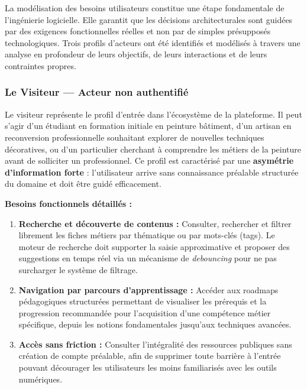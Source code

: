 \documentclass[12pt,a4paper]{report}
\begin{document}
\noindent
La modélisation des besoins utilisateurs constitue une étape fondamentale de l'ingénierie logicielle. Elle garantit que les décisions architecturales sont guidées par des exigences fonctionnelles réelles et non par de simples présupposés technologiques. Trois profils d'acteurs ont été identifiés et modélisés à travers une analyse en profondeur de leurs objectifs, de leurs interactions et de leurs contraintes propres.

\subsubsection*{Le Visiteur — Acteur non authentifié}

\noindent
Le visiteur représente le profil d'entrée dans l'écosystème de la plateforme. Il peut s'agir d'un étudiant en formation initiale en peinture bâtiment, d'un artisan en reconversion professionnelle souhaitant explorer de nouvelles techniques décoratives, ou d'un particulier cherchant à comprendre les métiers de la peinture avant de solliciter un professionnel. Ce profil est caractérisé par une \textbf{asymétrie d'information forte} : l'utilisateur arrive sans connaissance préalable structurée du domaine et doit être guidé efficacement.

\vspace{0.5em}
\textbf{Besoins fonctionnels détaillés :}

\begin{enumerate}[leftmargin=1.5cm, label=\textbf{BF-\arabic*.}, itemsep=5pt]
    \item \textbf{Recherche et découverte de contenus :} Consulter, rechercher et filtrer librement les fiches métiers par thématique ou par mots-clés (tags). Le moteur de recherche doit supporter la saisie approximative et proposer des suggestions en temps réel via un mécanisme de \textit{debouncing} pour ne pas surcharger le système de filtrage.
    \item \textbf{Navigation par parcours d'apprentissage :} Accéder aux roadmaps pédagogiques structurées permettant de visualiser les prérequis et la progression recommandée pour l'acquisition d'une compétence métier spécifique, depuis les notions fondamentales jusqu'aux techniques avancées.
    \item \textbf{Accès sans friction :} Consulter l'intégralité des ressources publiques sans création de compte préalable, afin de supprimer toute barrière à l'entrée pouvant décourager les utilisateurs les moins familiarisés avec les outils numériques.
\end{enumerate}
\end{document}
